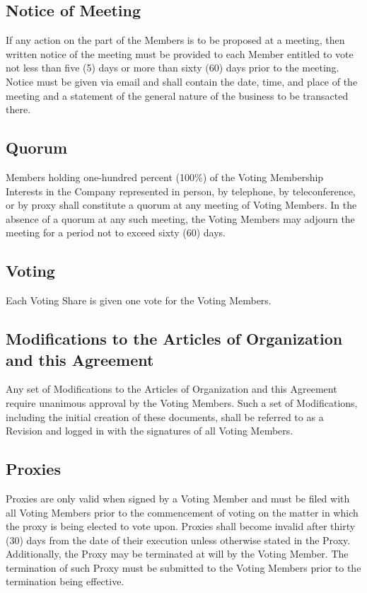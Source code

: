 \documentclass[11pt]{article}
\begin{document}
\subsection{Notice of Meeting}
If any action on the part of the Members is to be proposed at a meeting, then written notice of the meeting must be provided to each Member entitled to vote not less than five (5) days or more than sixty (60) days prior to the meeting. Notice must be given via email and shall contain the date, time, and place of the meeting and a statement of the general nature of the business to be transacted there.

\subsection{Quorum}
Members holding one-hundred percent (100\%) of the Voting Membership Interests in the Company represented in person, by telephone, by teleconference, or by proxy shall constitute a quorum at any meeting of Voting Members. In the absence of a quorum at any such meeting, the Voting Members may adjourn the meeting for a period not to exceed sixty (60) days.

\subsection{Voting}
Each Voting Share is given one vote for the Voting Members.

\subsection{Modifications to the Articles of Organization and this Agreement}
Any set of Modifications to the Articles of Organization and this Agreement require unanimous approval by the Voting Members. Such a set of Modifications, including the initial creation of these documents, shall be referred to as a Revision and logged in  with the signatures of all Voting Members.

\subsection{Proxies}
Proxies are only valid when signed by a Voting Member and must be filed with all Voting Members prior to the commencement of voting on the matter in which the proxy is being elected to vote upon. Proxies shall become invalid after thirty (30) days from the date of their execution unless otherwise stated in the Proxy. Additionally, the Proxy may be terminated at will by the Voting Member. The termination of such Proxy must be submitted to the Voting Members prior to the termination being effective.
\end{document}
